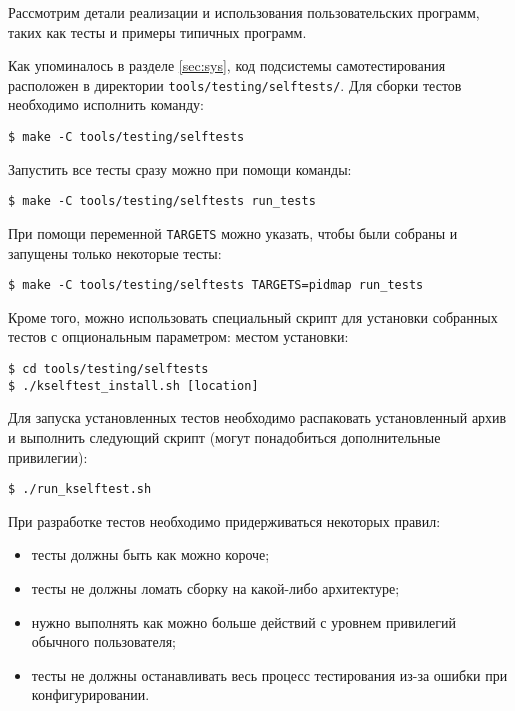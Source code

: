 Рассмотрим детали реализации и использования пользовательских программ, таких
как тесты и примеры типичных программ.

Как упоминалось в разделе \ref{sec:sys}, код подсистемы самотестирования
расположен в директории \texttt{tools/testing/selftests/}. Для сборки тестов
необходимо исполнить команду:
\medskip
\begin{lstlisting}[style=cstyle]
$ make -C tools/testing/selftests
\end{lstlisting}
\medskip

Запустить все тесты сразу можно при помощи команды:
\medskip
\begin{lstlisting}[style=cstyle]
$ make -C tools/testing/selftests run_tests
\end{lstlisting}
\medskip

При помощи переменной \texttt{TARGETS} можно указать, чтобы были собраны и
запущены только некоторые тесты:
\medskip
\begin{lstlisting}[style=cstyle]
$ make -C tools/testing/selftests TARGETS=pidmap run_tests
\end{lstlisting}
\medskip

Кроме того, можно использовать специальный скрипт для установки собранных тестов
с опциональным параметром: местом установки:
\medskip
\begin{lstlisting}[style=cstyle]
$ cd tools/testing/selftests
$ ./kselftest_install.sh [location]
\end{lstlisting}
\medskip

Для запуска установленных тестов необходимо распаковать установленный архив и
выполнить следующий скрипт (могут понадобиться дополнительные привилегии):
\medskip
\begin{lstlisting}[style=cstyle]
$ ./run_kselftest.sh
\end{lstlisting}
\medskip

При разработке тестов необходимо придерживаться некоторых правил:
\begin{itemize}
\item тесты должны быть как можно короче;
\item тесты не должны ломать сборку на какой-либо архитектуре;
\item нужно выполнять как можно больше действий с уровнем привилегий обычного
  пользователя;
\item тесты не должны останавливать весь процесс тестирования из-за ошибки при
  конфигурировании.
\end{itemize}

